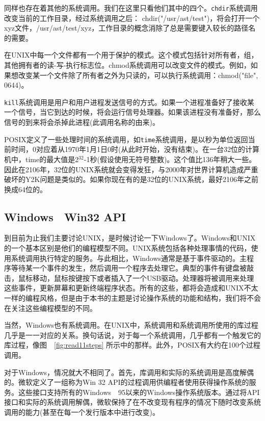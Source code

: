 	同样也存在着其他的系统调用。我们在这里只看他们其中的四个。\texttt{chdir}系统调用改变当前的工作目录，经过系统调用之后：
	chdir("/usr/ast/test")，将会打开一个xyz文件，/usr/ast/test/xyz，工作目录的概念消除了总是需要键入较长的路径名的需要。
	
	在UNIX中每一个文件都有一个用于保护的模式。这个模式包括针对所有者，组，其他拥有者的读-写-执行标志位。chmod系统调用可以改变文件的模式。例如，如果想改变某一个文件除了所有者之外为只读的，可以执行系统调用：chmod("file", 0644)。
	
	\texttt{kill}系统调用是用户和用户进程发送信号的方式。如果一个进程准备好了接收某一个信号，当它到达的时候，将会运行信号处理器。如果该进程没有准备好，那么信号的到来将会杀掉此进程(此调用名称的由来)。
	
	POSIX定义了一些处理时间的系统调用，如\texttt{time}系统调用，是以秒为单位返回当前时间，0对应着从1970年1月1日0时(从此时开始，没有结束)。在一台32位的计算机中，time的最大值是2$^{32}$-1秒(假设使用无符号整数)。这个值比136年稍大一些。因此在2106年，32位的UNIX系统就会变得发狂，与2000年对世界计算机造成严重破坏的Y2K问题是类似的。如果你现在有的是32位的UNIX系统，最好2106年之前换成64位的。
	
	\subsection{Windows　Win32 API}
	
	到目前为止我们主要讨论UNIX，是时候讨论一下Windows了。Windows和UNIX的一个基本区别是他们的编程模型不同。UNIX系统包括各种处理事情的代码，使用系统调用执行特定的服务。与此相比，Windows通常是基于事件驱动的。主程序等待某一个事件的发生，然后调用一个程序去处理它。典型的事件有键盘被敲击，鼠标移动，鼠标按键按下或者插入了一个USB驱动。处理器将被调用来处理这些事件，更新屏幕和更新终端程序状态。所有的这些，都将会造成和UNIX不太一样的编程风格，但是由于本书的主题是讨论操作系统的功能和结构，我们将不会在关注这些编程模型的不同。
	
	当然，Windows也有系统调用。在UNIX中，系统调用和系统调用所使用的库过程几乎是一一对应的关系。换句话说，对于每一个系统调用，几乎都有一个触发它的库过程，像图　\ref{fig:read11steps} 所示中的那样。此外，POSIX有大约在100个过程调用。
	
	对于Windows，情况就大不相同了。首先，库调用和实际的系统调用是高度解偶的。微软定义了一组称为Win 32 API的过程调用供编程者使用获得操作系统的服务。这些接口支持所有的Windows　95以来的Windows操作系统版本。通过将API接口和实际的系统调用解偶，微软保持了在不改变现有程序的情况下随时改变系统调用的能力(甚至在每一个发行版本中进行改变)。
	
